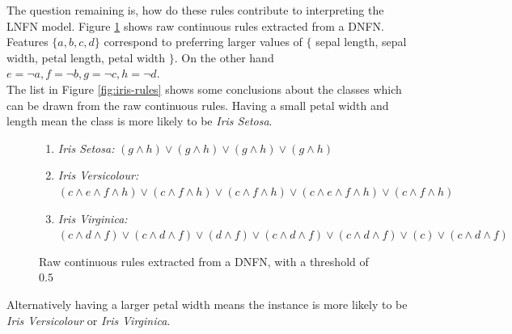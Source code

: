 \noindent
\begin{minipage}[t]{0.5\textwidth}
\vspace{0px}
The question remaining is, how do these rules contribute to interpreting the LNFN model. Figure \ref{fig:raw-iris-rules} shows raw continuous rules extracted from a DNFN. Features $\{a,b,c,d\}$ correspond to preferring larger values of $\{$ sepal length, sepal width, petal length, petal width $\}$. On the other hand $e = \lnot a, f = \lnot b, g = \lnot c, h = \lnot d$.\\

The list in Figure \ref{fig:iris-rules} shows some conclusions about the classes which can be drawn from the raw continuous rules. Having a small petal width and length mean the class is more likely to be \textit{Iris Setosa}. \\
\end{minipage}
\hspace{0.05\textwidth}
\begin{minipage}[t]{0.45\textwidth}
\vspace{0px}
\begin{figure}[H]
\begin{enumerate}
\item \textit{Iris Setosa:} $(g \land h) \lor (g \land h) \lor (g \land h) \lor (g \land h)$
\item \textit{Iris Versicolour:} $(c \land e \land f \land h) \lor (c \land f \land h) \lor (c \land f \land h) \lor (c \land e \land f \land h) \lor (c \land f \land h)$
\item \textit{Iris Virginica:} $(c \land d \land f) \lor (c \land d \land f) \lor (d \land f) \lor (c \land d \land f) \lor (c \land d \land f) \lor (c) \lor (c \land d \land f)$
\end{enumerate}
\caption{Raw continuous rules extracted from a DNFN, with a threshold of $0.5$}
\label{fig:raw-iris-rules}
\end{figure}
\end{minipage}

Alternatively having a larger petal width means the instance is more likely to be \textit{Iris Versicolour} or \textit{Iris Virginica}.


